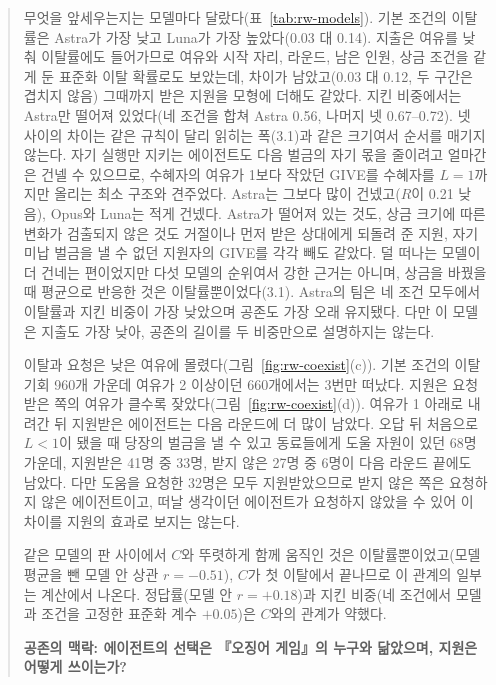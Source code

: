 \begin{quote}
{\color{black}무엇을 앞세우는지는 모델마다 달랐다(표~\ref{tab:rw-models}). 기본 조건의 이탈률은 Astra가 가장 낮고 Luna가 가장 높았다(0.03 대 0.14). 지출은 여유를 낮춰 이탈률에도 들어가므로 여유와 시작 자리, 라운드, 남은 인원, 상금 조건을 같게 둔 표준화 이탈 확률로도 보았는데, 차이가 남았고(0.03 대 0.12, 두 구간은 겹치지 않음) 그때까지 받은 지원을 모형에 더해도 같았다. 지킨 비중에서는 Astra만 떨어져 있었다(네 조건을 합쳐 Astra 0.56, 나머지 넷 0.67--0.72). 넷 사이의 차이는 같은 규칙이 달리 읽히는 폭(3.1)과 같은 크기여서 순서를 매기지 않는다. 자기 실행만 지키는 에이전트도 다음 벌금의 자기 몫을 줄이려고 얼마간은 건넬 수 있으므로, 수혜자의 여유가 1보다 작았던 GIVE를 수혜자를 $L=1$까지만 올리는 최소 구조와 견주었다. Astra는 그보다 많이 건넸고($R$이 0.21 낮음), Opus와 Luna는 적게 건넸다. Astra가 떨어져 있는 것도, 상금 크기에 따른 변화가 검출되지 않은 것도 거절이나 먼저 받은 상대에게 되돌려 준 지원, 자기 미납 벌금을 낼 수 없던 지원자의 GIVE를 각각 빼도 같았다. 덜 떠나는 모델이 더 건네는 편이었지만 다섯 모델의 순위여서 강한 근거는 아니며, 상금을 바꿨을 때 평균으로 반응한 것은 이탈률뿐이었다(3.1). Astra의 팀은 네 조건 모두에서 이탈률과 지킨 비중이 가장 낮았으며 공존도 가장 오래 유지됐다. 다만 이 모델은 지출도 가장 낮아, 공존의 길이를 두 비중만으로 설명하지는 않는다.}

{\color{black}이탈과 요청은 낮은 여유에 몰렸다(그림~\ref{fig:rw-coexist}(c)). 기본 조건의 이탈 기회 960개 가운데 여유가 2 이상이던 660개에서는 3번만 떠났다. 지원은 요청받은 쪽의 여유가 클수록 잦았다(그림~\ref{fig:rw-coexist}(d)). 여유가 1 아래로 내려간 뒤 지원받은 에이전트는 다음 라운드에 더 많이 남았다. 오답 뒤 처음으로 $L<1$이 됐을 때 당장의 벌금을 낼 수 있고 동료들에게 도울 자원이 있던 68명 가운데, 지원받은 41명 중 33명, 받지 않은 27명 중 6명이 다음 라운드 끝에도 남았다. 다만 도움을 요청한 32명은 모두 지원받았으므로 받지 않은 쪽은 요청하지 않은 에이전트이고, 떠날 생각이던 에이전트가 요청하지 않았을 수 있어 이 차이를 지원의 효과로 보지는 않는다.}

{\color{black}같은 모델의 판 사이에서 $C$와 뚜렷하게 함께 움직인 것은 이탈률뿐이었고(모델 평균을 뺀 모델 안 상관 $r=-0.51$), $C$가 첫 이탈에서 끝나므로 이 관계의 일부는 계산에서 나온다. 정답률(모델 안 $r=+0.18$)과 지킨 비중(네 조건에서 모델과 조건을 고정한 표준화 계수 $+0.05$)은 $C$와의 관계가 약했다.}

\par\medskip\noindent\textbf{공존의 맥락: 에이전트의 선택은 『오징어 게임』의 누구와 닮았으며, 지원은 어떻게 쓰이는가?}\par


\end{quote}
